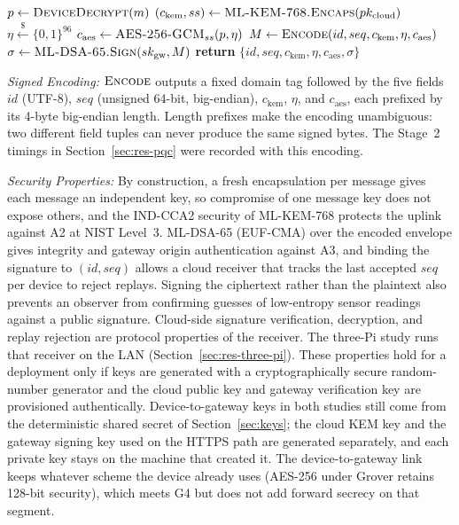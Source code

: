 \documentclass[journal]{IEEEtran}
\begin{document}
\begin{algorithm}[!t]
\caption{Stage 2 Re-Encryption of a Message $m$ Received by Stage 2}
\label{alg:reenc}
\begin{algorithmic}[1]
\State $p \gets \textsc{DeviceDecrypt}(m)$ 
\State $(c_\mathrm{kem}, ss) \gets \textsc{ML-KEM-768.Encaps}(pk_\mathrm{cloud})$
\State $\eta \xleftarrow{\$} \{0,1\}^{96}$
\State $c_\mathrm{aes} \gets \textsc{AES-256-GCM}_{ss}(p, \eta)$
\State $M \gets \textsc{Encode}(id, seq, c_\mathrm{kem}, \eta, c_\mathrm{aes})$
\State $\sigma \gets \textsc{ML-DSA-65.Sign}(sk_\mathrm{gw}, M)$
\State \textbf{return} $\{id, seq, c_\mathrm{kem}, \eta, c_\mathrm{aes}, \sigma\}$ 
\end{algorithmic}
\end{algorithm}

\textit{Signed Encoding:} $\textsc{Encode}$ outputs a fixed domain tag followed by the five fields $id$ (UTF-8), $seq$ (unsigned 64-bit, big-endian), $c_\mathrm{kem}$, $\eta$, and $c_\mathrm{aes}$, each prefixed by its 4-byte big-endian length. Length prefixes make the encoding unambiguous: two different field tuples can never produce the same signed bytes. The Stage~2 timings in Section~\ref{sec:res-pqc} were recorded with this encoding.

\textit{Security Properties:} By construction, a fresh encapsulation per message gives each message an independent key, so compromise of one message key does not expose others, and the IND-CCA2 security of ML-KEM-768 protects the uplink against A2 at NIST Level~3. ML-DSA-65 (EUF-CMA) over the encoded envelope gives integrity and gateway origin authentication against A3, and binding the signature to $(id, seq)$ allows a cloud receiver that tracks the last accepted $seq$ per device to reject replays. Signing the ciphertext rather than the plaintext also prevents an observer from confirming guesses of low-entropy sensor readings against a public signature. Cloud-side signature verification, decryption, and replay rejection are protocol properties of the receiver. The three-Pi study runs that receiver on the LAN (Section~\ref{sec:res-three-pi}). These properties hold for a deployment only if keys are generated with a cryptographically secure random-number generator and the cloud public key and gateway verification key are provisioned authentically. Device-to-gateway keys in both studies still come from the deterministic shared secret of Section~\ref{sec:keys}; the cloud KEM key and the gateway signing key used on the HTTPS path are generated separately, and each private key stays on the machine that created it. The device-to-gateway link keeps whatever scheme the device already uses (AES-256 under Grover retains 128-bit security), which meets G4 but does not add forward secrecy on that segment.
\end{document}
